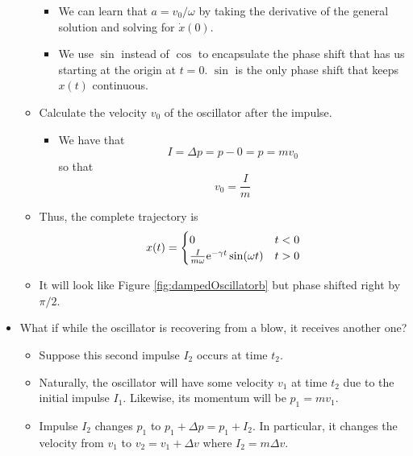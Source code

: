 \documentclass[../notes.tex]{subfiles}
\begin{document}
\begin{itemize}
\begin{itemize}
\begin{equation*}
        \end{equation*}
        \begin{itemize}
            \item We can learn that $a=v_0/\omega$ by taking the derivative of the general solution and solving for $\dot{x}(0)$.
            \item We use $\sin$ instead of $\cos$ to encapsulate the phase shift that has us starting at the origin at $t=0$. $\sin$ is the only phase shift that keeps $x(t)$ continuous.
        \end{itemize}
        \item Calculate the velocity $v_0$ of the oscillator after the impulse.
        \begin{itemize}
            \item We have that
            \begin{equation*}
                I = \Delta p = p-0 = p = mv_0
            \end{equation*}
            so that
            \begin{equation*}
                v_0 = \frac{I}{m}
            \end{equation*}
        \end{itemize}
        \item Thus, the complete trajectory is
        \begin{equation*}
            x(t) =
            \begin{cases}
                0 & t<0\\
                \frac{I}{m\omega}\e[-\gamma t]\sin(\omega t) & t>0
            \end{cases}
        \end{equation*}
        \item It will look like Figure \ref{fig:dampedOscillatorb} but phase shifted right by $\pi/2$.
    \end{itemize}
    \item What if while the oscillator is recovering from a blow, it receives another one?
    \begin{itemize}
        \item Suppose this second impulse $I_2$ occurs at time $t_2$.
        \item Naturally, the oscillator will have some velocity $v_1$ at time $t_2$ due to the initial impulse $I_1$. Likewise, its momentum will be $p_1=mv_1$.
        \item Impulse $I_2$ changes $p_1$ to $p_1+\Delta p=p_1+I_2$. In particular, it changes the velocity from $v_1$ to $v_2=v_1+\Delta v$ where $I_2=m\Delta v$.

\end{itemize}
\end{itemize}
\end{document}
